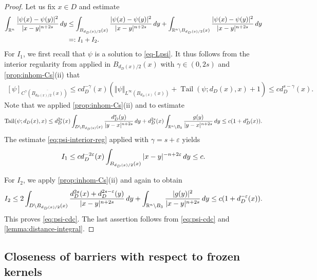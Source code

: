 \documentclass[11pt,reqno]{amsart}
\theoremstyle{plain}
\theoremstyle{definition}
\numberwithin{equation}{section}
\newcommand{\R}{\mathbb{R}}
\newcommand{\eps}{\varepsilon}
\newcommand{\1}{\mathbbm{1}}
\DeclareMathOperator{\tail}{Tail}
\renewcommand{\d}{\textnormal{\,d}}
\begin{document}
\begin{proof}
Let us fix $x \in D$ and estimate
\begin{align*}
\int_{\R^n} \frac{|\psi(x) - \psi(y)|^2}{|x-y|^{n+2s}} \d y
&\le \int_{B_{d_D(x)/2}(x)} \frac{|\psi(x) - \psi(y)|^2}{|x-y|^{n+2s}} \d y + \int_{\R^n \setminus B_{d_D(x)/2}(x)} \frac{|\psi(x)-\psi(y)|^2}{|x-y|^{n+2s}} \d y \\
&=: I_1 + I_2.
\end{align*}
For $I_1$, we first recall that $\psi$ is a solution to \eqref{eq-Lpsi}. It thus follows from the interior regularity from \cite[Theorem~2.4.3]{FeRo24} applied in $B_{d_D(x)/2}(x)$ with $\gamma \in (0,2s)$ and \autoref{prop:inhom-Cs}(ii) that
\begin{align}
\label{eq:psi-interior-reg}
[\psi]_{C^{\gamma}(\overline{B_{d_{D}(x)/2}(x)})} \le c d_D^{-\gamma}(x) \left( \Vert \psi \Vert_{L^{\infty}(B_{d_D(x)}(x))} + \tail(\psi;d_D(x),x) + 1\right) \le c d_D^{s-\gamma}(x).
\end{align}
Note that we applied \autoref{prop:inhom-Cs}(ii) and \cite[Lemma~B.2.4]{FeRo24} to estimate
\begin{align*}
    \tail(\psi;d_D(x),x)
    \leq d_D^{2s}(x) \int_{D \setminus B_{d_D(x)}(x)} \frac{d_D^s(y)}{|y-x|^{n+2s}} \d y + d_D^{2s}(x) \int_{\R^n \setminus B_3} \frac{g(y)}{|y-x|^{n+2s}} \d y \leq c(1+d_D^s(x)).
\end{align*}
The estimate \eqref{eq:psi-interior-reg} applied with $\gamma = s + \eps$ yields
\begin{align*}
I_1 \le c d_D^{-2\eps}(x) \int_{B_{d_D(x)/2}(x)} |x-y|^{-n+2\eps} \d y \le c.
\end{align*}

For $I_2$, we apply \autoref{prop:inhom-Cs}(ii) and \cite[Lemma~B.2.4]{FeRo24} again to obtain
\begin{align*}
    I_2 \leq 2\int_{D \setminus B_{d_D(x)/2}(x)} \frac{d_D^{2s}(x) + d_D^{2s-\varepsilon}(y)}{|x-y|^{n+2s}} \d y + \int_{\R^n \setminus B_3} \frac{|g(y)|^2}{|x-y|^{n+2s}} \d y \leq c(1+d_D^{-\varepsilon}(x)).
\end{align*}
This proves \eqref{eq:psi-cdc}. The last assertion follows from \eqref{eq:psi-cdc} and \autoref{lemma:distance-integral}.
\end{proof}



\subsection{Closeness of barriers with respect to frozen kernels}
\end{document}
